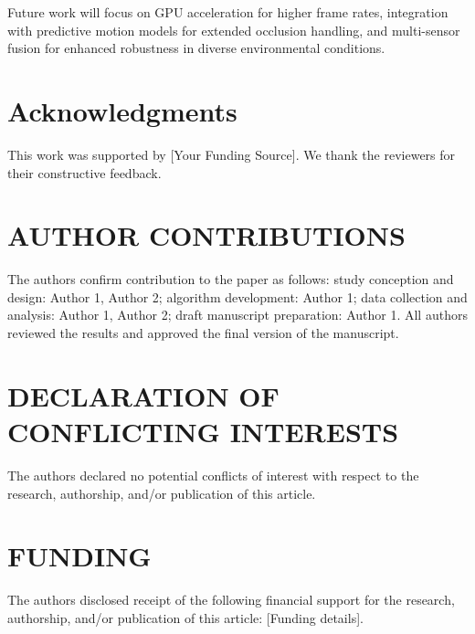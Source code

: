\documentclass[numbered]{trbunofficial}
\begin{document}
Future work will focus on GPU acceleration for higher frame rates, integration with predictive motion models for extended occlusion handling, and multi-sensor fusion for enhanced robustness in diverse environmental conditions.


\section{Acknowledgments}
This work was supported by [Your Funding Source]. We thank the reviewers for their constructive feedback.

\section*{AUTHOR CONTRIBUTIONS}
The authors confirm contribution to the paper as follows:
study conception and design: Author 1, Author 2;
algorithm development: Author 1;
data collection and analysis: Author 1, Author 2;
draft manuscript preparation: Author 1.
All authors reviewed the results and approved the final version of the manuscript.

\section*{DECLARATION OF CONFLICTING INTERESTS}
The authors declared no potential conflicts of interest with respect to the research, authorship, and/or publication of this article.

\section*{FUNDING}
The authors disclosed receipt of the following financial support
for the research, authorship, and/or publication of this article:
[Funding details].

\newpage


\end{document}
